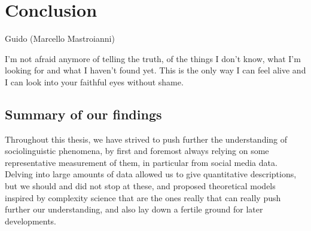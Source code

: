 \documentclass[../thesis.tex]{subfiles}
\begin{document}
\chapter{Conclusion}
\label{ch:conclusion}

\epigraph{
  \begin{center}
    \textnormal{Guido (Marcello Mastroianni)}\\
  \end{center}
  I'm not afraid anymore of telling the truth, of the things I don't know, what I'm
  looking for and what I haven't found yet. This is the only way I can feel alive and I
  can look into your faithful eyes without shame.
}{
}


\section{Summary of our findings}
Throughout this thesis, we have strived to push further the understanding of
sociolinguistic phenomena, by first and foremost always relying on some representative
measurement of them, in particular from social media data. Delving into large amounts of
data allowed us to give quantitative descriptions, but we should and did not stop at
these, and proposed theoretical models inspired by complexity science that are the ones
really that can really push further our understanding, and also lay down a fertile
ground for later developments.
\end{document}
